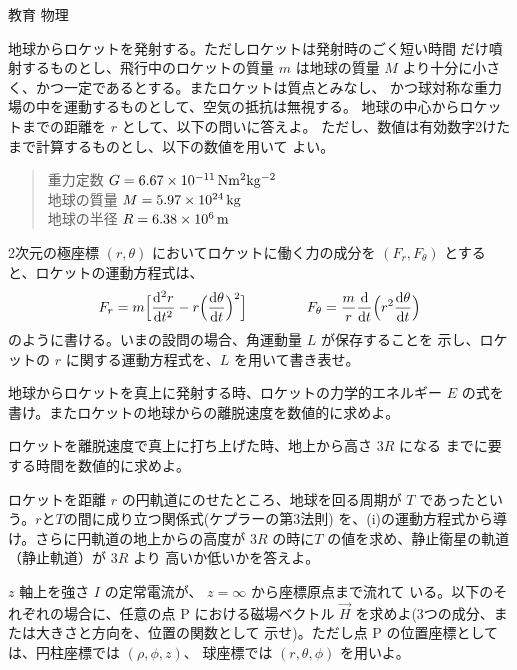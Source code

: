 \documentclass[fleqn]{jbook}
\begin{document}
\begin{question}{教育 物理}{}


\begin{subquestions}
\SubQuestion
  地球からロケットを発射する。ただしロケットは発射時のごく短い時間
  だけ噴射するものとし、飛行中のロケットの質量 $m$ は地球の質量 $M$
  より十分に小さく、かつ一定であるとする。またロケットは質点とみなし、
  かつ球対称な重力場の中を運動するものとして、空気の抵抗は無視する。
  地球の中心からロケットまでの距離を $r$ として、以下の問いに答えよ。
  ただし、数値は有効数字2けたまで計算するものとし、以下の数値を用いて
  よい。
%
  \begin{quote}
    重力定数   $G=6.67\times 10^{-11}\,{\rm Nm^2kg^{-2}}$ \\
    地球の質量 $M=5.97\times 10^{24} \,{\rm kg}$ \\
    地球の半径 $R=6.38\times 10^{6}\,{\rm m}$
  \end{quote}

  \begin{subsubquestions}
  \SubSubQuestion
    2次元の極座標 $(r,\theta)$ においてロケットに働く力の成分を
    $(F_r,F_\theta)$ とすると、ロケットの運動方程式は、
%
    \[ F_r = m \Bigl[%
              \Deriver{^2r}{t^2} - r \Bigl(\Deriver{\theta}{t}\Bigr)^2%
             \Bigr]  \hspace{15mm}%
       F_{\theta} = \frac{m}{r}\Deriver{}{t}\Bigl(%
              r^2\Deriver{\theta}{t}%
             \Bigr) \]
%
    のように書ける。いまの設問の場合、角運動量 $L$ が保存することを
    示し、ロケットの $r$ に関する運動方程式を、$L$ を用いて書き表せ。

  \SubSubQuestion
    地球からロケットを真上に発射する時、ロケットの力学的エネルギー
    $E$ の式を書け。またロケットの地球からの離脱速度を数値的に求めよ。

  \SubSubQuestion
    ロケットを離脱速度で真上に打ち上げた時、地上から高さ $3R$ になる
    までに要する時間を数値的に求めよ。

  \SubSubQuestion
    ロケットを距離 $r$ の円軌道にのせたところ、地球を回る周期が $T$
    であったという。$r$と$T$の間に成り立つ関係式(ケプラーの第3法則)
    を、(i)の運動方程式から導け。さらに円軌道の地上からの高度が $3R$
    の時に$T$ の値を求め、静止衛星の軌道（静止軌道）が $3R$ より
    高いか低いかを答えよ。

  \end{subsubquestions}


\SubQuestion
  $z$ 軸上を強さ $I$ の定常電流が、 $z=\infty$ から座標原点まで流れて
  いる。以下のそれぞれの場合に、任意の点 P における磁場ベクトル
  $\vec{H}$ を求めよ(3つの成分、または大きさと方向を、位置の関数として
  示せ)。ただし点 P の位置座標としては、円柱座標では $(\rho,\phi,z)$、
  球座標では $(r,\theta,\phi)$ を用いよ。


\end{subquestions}
\end{question}
\end{document}
